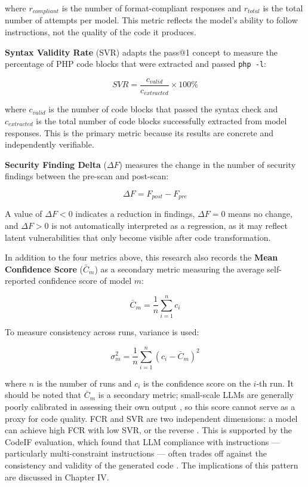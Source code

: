 where $r_{compliant}$ is the number of format-compliant responses and $r_{total}$ is the total number of attempts per model. This metric reflects the model's ability to follow instructions, not the quality of the code it produces.

\textbf{Syntax Validity Rate} (SVR) adapts the pass@1 concept \cite{roziere2024codellama}\cite{hui2024qwen} to measure the percentage of PHP code blocks that were extracted and passed \texttt{php -l}:

\begin{equation}
    SVR = \frac{c_{valid}}{c_{extracted}} \times 100\%
    \label{eq:svr}
\end{equation}

where $c_{valid}$ is the number of code blocks that passed the syntax check and $c_{extracted}$ is the total number of code blocks successfully extracted from model responses. This is the primary metric because its results are concrete and independently verifiable.

\textbf{Security Finding Delta} ($\Delta F$) measures the change in the number of security findings between the pre-scan and post-scan:

\begin{equation}
    \Delta F = F_{post} - F_{pre}
    \label{eq:deltaf}
\end{equation}

A value of $\Delta F < 0$ indicates a reduction in findings, $\Delta F = 0$ means no change, and $\Delta F > 0$ is not automatically interpreted as a regression, as it may reflect latent vulnerabilities that only become visible after code transformation.

In addition to the four metrics above, this research also records the \textbf{Mean Confidence Score} ($\bar{C}_m$) as a secondary metric measuring the average self-reported confidence score of model $m$:

\begin{equation}
    \bar{C}_m = \frac{1}{n} \sum_{i=1}^{n} c_i
    \label{eq:conf-mean}
\end{equation}

To measure consistency across runs, variance is used:

\begin{equation}
    \sigma^2_m = \frac{1}{n} \sum_{i=1}^{n} (c_i - \bar{C}_m)^2
    \label{eq:conf-var}
\end{equation}

where $n$ is the number of runs and $c_i$ is the confidence score on the $i$-th run. It should be noted that $\bar{C}_m$ is a secondary metric; small-scale LLMs are generally poorly calibrated in assessing their own output \cite{akuthota2023vulnerability, li2025iris}, so this score cannot serve as a proxy for code quality. FCR and SVR are two independent dimensions: a model can achieve high FCR with low SVR, or the reverse \cite{zhou2023ifeval}. This is supported by the CodeIF evaluation, which found that LLM compliance with instructions — particularly multi-constraint instructions — often trades off against the consistency and validity of the generated code \cite{yan2025codeif}. The implications of this pattern are discussed in Chapter IV.

